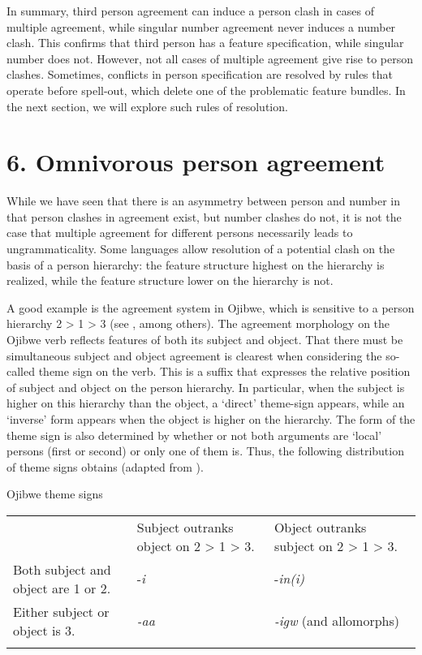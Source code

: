 \documentclass[output=paper]{langsci/langscibook}
\begin{document}
In summary, third person agreement can induce a person clash in cases of multiple agreement, while singular number agreement never induces a number clash. This confirms that third person has a feature specification, while singular number does not. However, not all cases of multiple agreement give rise to person clashes. Sometimes, conflicts in person specification are resolved by rules that operate before spell-out, which delete one of the problematic feature bundles. In the next section, we will explore such rules of resolution.

\section{ 6. Omnivorous person agreement}

While we have seen that there is an asymmetry between person and number in that person clashes in agreement exist, but number clashes do not, it is not the case that multiple agreement for different persons necessarily leads to ungrammaticality. Some languages allow resolution of a potential clash on the basis of a person hierarchy: the feature structure highest on the hierarchy is realized, while the feature structure lower on the hierarchy is not. 

  A good example is the agreement system in Ojibwe, which is sensitive to a person hierarchy 2 > 1 > 3 (see \citealt{Valentine2001}, among others). The agreement morphology on the Ojibwe verb reflects features of both its subject and object. That there must be simultaneous subject and object agreement is clearest when considering the so-called theme sign on the verb. This is a suffix that expresses the relative position of subject and object on the person hierarchy. In particular, when the subject is higher on this hierarchy than the object, a ‘direct’ theme-sign appears, while an ‘inverse’ form appears when the object is higher on the hierarchy. The form of the theme sign is also determined by whether or not both arguments are ‘local’ persons (first or second) or only one of them is. Thus, the following distribution of theme signs obtains (adapted from \citealt{Lochbihler2008}).

\ea 
   Ojibwe theme signs

\begin{tabularx}{\textwidth}{XXX} 
\lsptoprule
& Subject outranks object on 2 > 1 > 3. & Object outranks subject on 2 > 1 > 3.\\
Both subject and object are 1 or 2. & {}-\textit{i} & {}-\textit{in(i)}\\
Either subject or object is 3. & \textit{{}-aa} & \textit{{}-igw} (and allomorphs)\\
\lspbottomrule
\end{tabularx}
\z
\end{document}
